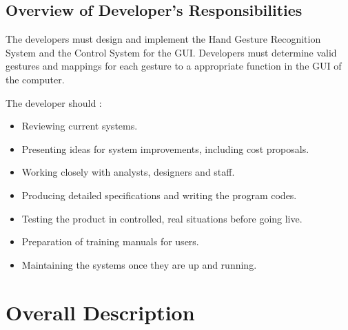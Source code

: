 \documentclass[11pt]{report}
\begin{document}
\subsection{Overview of Developer's Responsibilities}
The developers must design and implement the Hand Gesture Recognition System and the Control System for the GUI. Developers must determine valid gestures and mappings for each gesture to a appropriate function in the GUI of the computer. 

The developer should :
\begin{itemize}
\item Reviewing current systems.
\item Presenting ideas for system improvements, including cost proposals.
\item Working closely with analysts, designers and staff.
\item Producing detailed specifications and writing the program codes.
\item Testing the product in controlled, real situations before going live.
\item Preparation of training manuals for users.
\item Maintaining the systems once they are up and running.
\end{itemize}

\newpage
\section{Overall Description}
\end{document}
